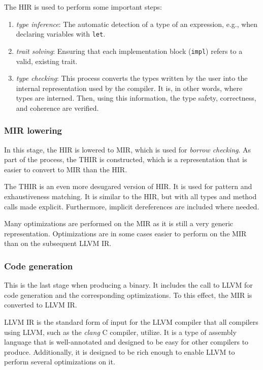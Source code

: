 The \acrshort{HIR} is used to perform some important steps:

\begin{enumerate}
      \item \emph{type inference}: The automatic detection of a type
            of an expression, e.g., when declaring variables with \texttt{let}.
      \item \emph{trait solving}: Ensuring that each implementation block (\texttt{impl})
            refers to a valid, existing trait.
      \item \emph{type checking}: This process converts the types written by the user
            into the internal representation used by the compiler.
            It is, in other words, where types are interned.
            Then, using this information, the type safety, correctness, and coherence are verified.
\end{enumerate}

\subsubsection{MIR lowering}

In this stage, the \acrshort{HIR} is lowered to \acrfull{MIR},
which is used for \emph{borrow checking}.
As part of the process, the \acrfull{THIR} is constructed,
which is a representation that is easier to convert to \acrshort{MIR} than the \acrshort{HIR}.

The \acrshort{THIR} is an even more desugared version of \acrshort{HIR}.
It is used for pattern and exhaustiveness matching.
It is similar to the \acrshort{HIR}, but with all types and method calls made explicit.
Furthermore, implicit dereferences are included where needed.

Many optimizations are performed on the \acrshort{MIR}
as it is still a very generic representation.
Optimizations are in some cases easier
to perform on the \acrshort{MIR} than on the subsequent LLVM \acrshort{IR}.

\subsubsection{Code generation}

This is the last stage when producing a binary.
It includes the call to LLVM for code generation
and the corresponding optimizations.
To this effect, the \acrshort{MIR} is converted to LLVM \acrshort{IR}.

LLVM \acrshort{IR} is the standard form of input for the LLVM compiler
that all compilers using LLVM, such as the \emph{clang} C compiler, utilize.
It is a type of assembly language that is well-annotated
and designed to be easy for other compilers to produce.
Additionally, it is designed to be rich enough to enable LLVM
to perform several optimizations on it.

